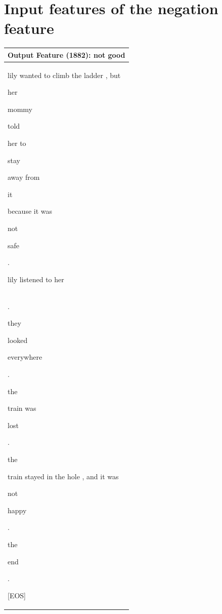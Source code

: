 \documentclass{article} %
\begin{document}

\newpage

\section{Input features of the negation feature} \label{app:sae_features}

\renewcommand{\arraystretch}{2.0}
\begin{table}[h]
\centering
\tiny
\begin{tabular}{|l|}

\hline
\normalsize \textbf{Output Feature (1882): not good} \\
\hline
lily wanted to climb the ladder , but \colorbox{rgb,255:red,226;green,237;blue,247}{\strut  her} mommy \colorbox{rgb,255:red,234;green,242;blue,249}{\strut  told} her to \colorbox{rgb,255:red,229;green,239;blue,248}{\strut  stay} away from \colorbox{rgb,255:red,217;green,231;blue,244}{\strut  it} because it was \colorbox{rgb,255:red,106;green,130;blue,166}{\strut  not} \colorbox{rgb,255:red,216;green,231;blue,243}{\strut  safe} \colorbox{rgb,255:red,243;green,247;blue,252}{\strut  .} lily listened to her \\ 
\hline 

. \colorbox{rgb,255:red,241;green,246;blue,252}{\strut  they} \colorbox{rgb,255:red,234;green,242;blue,249}{\strut  looked} everywhere \colorbox{rgb,255:red,240;green,246;blue,251}{\strut  .} \colorbox{rgb,255:red,240;green,246;blue,251}{\strut  the} train was \colorbox{rgb,255:red,232;green,241;blue,249}{\strut  lost} \colorbox{rgb,255:red,231;green,240;blue,248}{\strut  .} \colorbox{rgb,255:red,235;green,243;blue,250}{\strut  the} train stayed in the hole , and it was \colorbox{rgb,255:red,106;green,130;blue,166}{\strut  not} \colorbox{rgb,255:red,211;green,229;blue,241}{\strut  happy} \colorbox{rgb,255:red,228;green,238;blue,247}{\strut  .} \colorbox{rgb,255:red,229;green,238;blue,247}{\strut  the} end \colorbox{rgb,255:red,236;green,243;blue,250}{\strut  .} \colorbox{rgb,255:red,238;green,244;blue,250}{\strut  [EOS]} \\ 
\hline 


\end{tabular}
\end{table}
\end{document}
